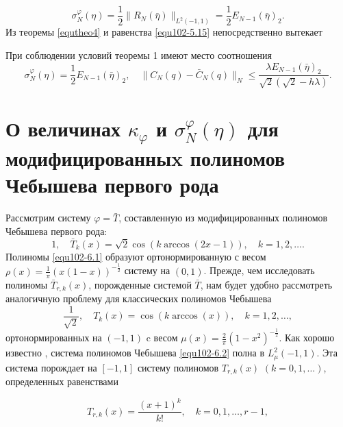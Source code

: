 \begin{equation}\label{equ102-5.15}
\sigma_N^\varphi(\eta)=\frac12\|R_N(\bar\eta)\|_{L^2(-1,1)}=\frac12E_{N-1}(\bar\eta)_2.
\end{equation}
Из теоремы \ref{equtheo4} и равенства \eqref{equ102-5.15} непосредственно вытекает
\begin{theorem}\label{equtheo6}
  При соблюдении условий теоремы 1 имеют место соотношения
  \begin{equation}\label{equ102-5.16}
  \sigma_N^\varphi(\eta)=\frac12E_{N-1}(\bar\eta)_2, \quad
\|C_N(q)-\bar C_N(q)\|_N\le \frac{\lambda E_{N-1}(\bar\eta)_2} {\sqrt{2}(\sqrt{2}-h\lambda)}.
\end{equation}
\end{theorem}






\section{О величинах  $\kappa_\varphi$ и $\sigma_N^\varphi(\eta)$ для модифицированныx полиномов Чебышева первого рода}


Рассмотрим систему $\varphi=\bar T$, составленную из модифицированных полиномов Чебышева первого рода:
 \begin{equation}\label{equ102-6.1}
1,\quad \bar T_k(x)=\sqrt{2}\cos(k\arccos(2x-1)), \quad k=1,2,\ldots.
\end{equation}
 Полиномы \eqref{equ102-6.1} образуют ортонормированную   с весом  $\rho(x)=\frac1\pi(x(1-x))^{-\frac12}$ систему на $(0,1)$. Прежде, чем  исследовать полиномы $\bar T_{r,k}(x)$, порожденные системой $\bar T$, нам будет удобно рассмотреть аналогичную проблему для классических  полиномов Чебышева
 \begin{equation}\label{equ102-6.2}
\frac{1}{\sqrt{2}},\quad  T_k(x)=\cos(k\arccos(x)), \quad k=1,2,\ldots,
\end{equation}
ортонормированных на $(-1,1)$ c весом  $\mu(x)=\frac2\pi(1-x^2)^{-\frac12}$.
   Как хорошо известно \cite{Sege}, система полиномов Чебышева \eqref{equ102-6.2} полна в $L_\mu^2(-1,1)$.   Эта система порождает на $[-1,1]$ систему полиномов $T_{r,k}(x)$ $(k=0,1,\ldots)$, определенных равенствами

  \begin{equation}\label{equ102-6.3}
T_{r,k}(x) =\frac{(x+1)^k}{k!}, \quad k=0,1,\ldots, r-1,
\end{equation}


